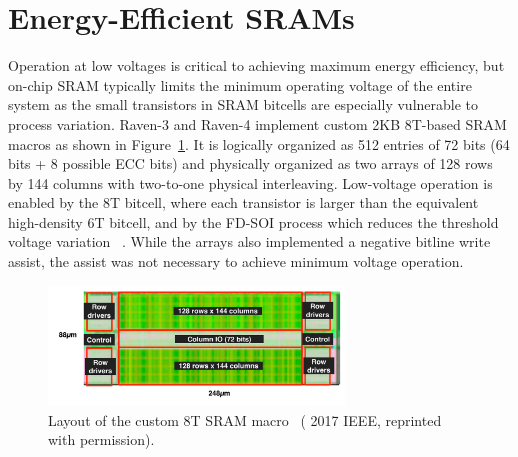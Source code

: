 \documentclass[graybox]{svmult}
\begin{document}


\section{Energy-Efficient SRAMs}

Operation at low voltages is critical to achieving maximum energy efficiency, but on-chip SRAM typically limits the minimum operating voltage of the entire system as the small transistors in SRAM bitcells are especially vulnerable to process variation.
Raven-3 and Raven-4 implement custom 2KB 8T-based SRAM macros as shown in Figure~\ref{fig:sram}.
It is logically organized as 512 entries of 72 bits (64 bits + 8 possible ECC bits) and physically organized as two arrays of 128 rows by 144 columns with two-to-one physical interleaving.
Low-voltage operation is enabled by the 8T bitcell, where each transistor is larger than the equivalent high-density 6T bitcell, and by the FD-SOI process which reduces the threshold voltage variation \cite{planes}~\cite{raven1}.
While the arrays also implemented a negative bitline write assist, the assist was not necessary to achieve minimum voltage operation.

\begin{figure}
  \centering
  \includegraphics[width=0.7\textwidth]{sram}
  \caption{Layout of the custom 8T SRAM macro~\cite{Keller2017} ({\textcopyright} 2017 IEEE, reprinted with permission).}
  \label{fig:sram}
\end{figure}
\end{document}
